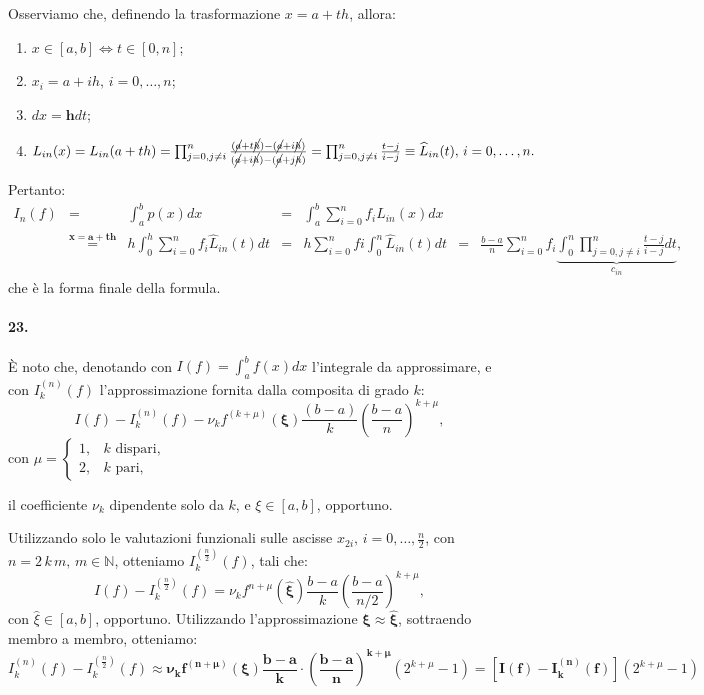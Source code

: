 \noindent Osserviamo che, definendo la trasformazione $x=a+th$, allora:
\begin{enumerate}
    \item $x\in[a,b]\iff t\in[0,n]$;
    \item $x_i=a+ih,\, i=0,\hdots,n$;
    \item $dx=\boldsymbol h dt$;
    \item $L_{in}(x) = L_{in}(a+th) = \prod_{j=0,j\neq i}^n\frac{(\cancel{a}+t\cancel{h})-(\cancel{a}+i\cancel{h})}{(\cancel{a}+i\cancel{h})-(\cancel{a}+j\cancel{h})} = \prod_{j=0,j\neq i}^n\frac{t-j}{i-j}\equiv \widehat L_{in}(t),\, i=0,\hdots, n.$
\end{enumerate}
Pertanto:
\begin{equation*}
    \begin{matrix}
        I_n(f) &=& \int_a^b p(x) dx &=& \int_a^b\sum_{i=0}^n f_iL_{in}(x)dx\\
        &\overset{\boldsymbol{x=a+th}}{=}& h\int_0^h\sum_{i=0}^nf_i \widehat L_{in}(t)dt &=& h \sum_{i=0}^n fi \int_0^n \widehat L_{in}(t)dt &=& \frac{b-a}{n} \sum_{i=0}^n f_i \underbrace{\int_0^n\prod_{j=0, j\neq i}^n\frac{t-j}{i-j}dt}_{c_{in}},
    \end{matrix}
\end{equation*}
che è la forma finale della formula.

\paragraph{23.} È noto che, denotando con $I(f)=\int_a^b f(x) dx$ l'integrale da approssimare, e con $I_k^{(n)}(f)$ l'approssimazione fornita dalla composita di grado $k$:
\begin{equation*}
    I(f) - I_k^{(n)}(f)-\nu_kf^{(k+\mu)}(\boldsymbol\xi)\frac{(b-a)}{k}\left(\frac{b-a}{n}\right)^{k+\mu},
\end{equation*}
con
$\mu =\begin{cases}
     1, & k \text{ dispari,}\\
     2, & k \text{ pari,}
\end{cases}$

\noindent il coefficiente $\nu_k$ dipendente solo da $k$, e $\xi\in[a,b]$, opportuno.

\noindent Utilizzando solo le valutazioni funzionali sulle ascisse $x_{2i},\, i=0,\hdots, \frac{n}{2}$, con $n=2\,k\,m,\, m\in\mathbb N$, otteniamo $I_k^{(\frac{n}{2})}(f)$, tali che:
\begin{equation*}
    I(f) - I_k^{(\frac{n}{2})}(f)=\nu_k f^{n+\mu}(\boldsymbol{\widehat\xi})\frac{b-a}{k}\left(\frac{b-a}{n/2}\right)^{k+\mu},
\end{equation*}
con $\widehat\xi\in [a,b]$, opportuno. Utilizzando l'approssimazione $\boldsymbol{\xi\approx\widehat\xi}$, sottraendo membro a membro, otteniamo:
\begin{equation*}
    I_k^{(n)}(f)-I_k^{(\frac{n}{2})}(f)\approx\boldsymbol{\nu_kf^{(n+\mu)}(\xi)\frac{b-a}{k}\cdot \left(\frac{b-a}{n}\right)^{k+\mu}} \left(2^{k+\mu}-1\right) = \left[\boldsymbol{I(f)-I_k^{(n)}(f)}\right]\left(2^{k+\mu}-1\right)
\end{equation*}

